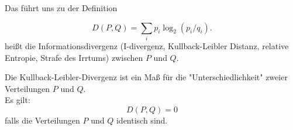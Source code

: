 Das führt uns zu der Definition
\begin{definition}
\[D(P,Q)=\sum_ip_i\log_2(p_i/q_i).\]
heißt die Informationsdivergenz (I-divergenz, Kullback-Leibler Distanz,
relative Entropie, Strafe des Irrtums) zwischen $P$ und $Q$.
\end{definition}
Die Kullback-Leibler-Divergenz ist ein Maß für die "Unterschiedlichkeit" zweier Verteilungen $P$ und $Q$.\\
Es gilt:
\[D(P,Q) = 0\]
falls die Verteilungen $P$ und $Q$ identisch sind.





